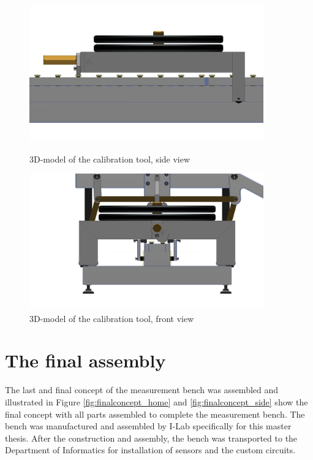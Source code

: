 \begin{figure}[!htb]
   \begin{minipage}{0.44\textwidth}
     \centering
     \includegraphics[width=0.9\textwidth]{figures/calibration_tool3.png}
     \caption{3D-model of the calibration tool, side view}
     \label{fig:calibrationtool}
   \end{minipage}\hfill
   \begin{minipage}{0.44\textwidth}
     \centering
     \includegraphics[width=0.9\textwidth]{figures/calibration_tool_front.png}
     \caption{3D-model of the calibration tool, front view}
     \label{fig:calibrationtool_side}
   \end{minipage}
\end{figure}

\section{The final assembly}
\label{sec:finalconcept}
The last and final concept of the measurement bench was assembled and illustrated in Figure \ref{fig:finalconcept_home} and  \ref{fig:finalconcept_side} show the final concept with all parts assembled to complete the measurement bench. The bench was manufactured and assembled by I-Lab specifically for this master thesis. After the construction and assembly, the bench was transported to the Department of Informatics for installation of sensors and the custom circuits.

